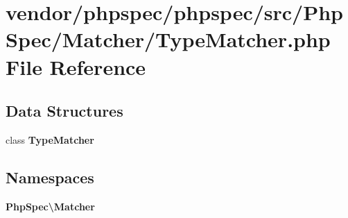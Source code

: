 \section{vendor/phpspec/phpspec/src/\+Php\+Spec/\+Matcher/\+Type\+Matcher.php File Reference}
\label{_type_matcher_8php}
\subsection*{Data Structures}
\begin{DoxyCompactItemize}
\item 
class {\bf Type\+Matcher}
\end{DoxyCompactItemize}
\subsection*{Namespaces}
\begin{DoxyCompactItemize}
\item 
 {\bf Php\+Spec\textbackslash{}\+Matcher}
\end{DoxyCompactItemize}
